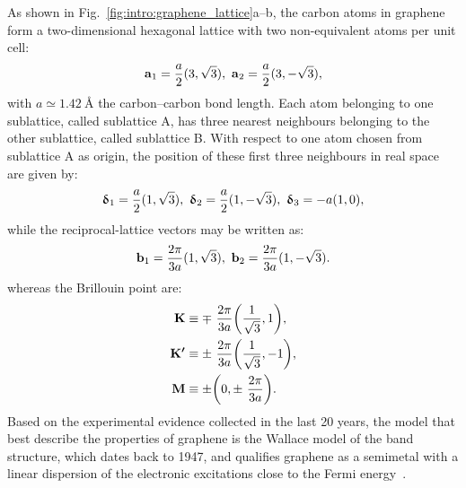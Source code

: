As shown in Fig.~\ref{fig:intro:graphene_lattice}a--b, the carbon atoms in graphene form a two-dimensional hexagonal lattice with two non-equivalent atoms per unit cell:
%
\begin{equation}\label{eq:graphene_lattice_vectors}
    \boldsymbol{\mathbf{a}}{_1} = \frac{a}{2}(3, \sqrt{3}),~
    \boldsymbol{\mathbf{a}}{_2} = \frac{a}{2}(3, -\sqrt{3}),
\end{equation}
%
with $a\simeq\SI{1.42}{\angstrom}$ the carbon--carbon bond length.
Each atom belonging to one sublattice, called sublattice A, has three nearest neighbours belonging to the other sublattice, called sublattice B. With respect to one atom chosen from sublattice A as origin, the position of these first three neighbours in real space are given by:
%
\begin{equation}\label{eq:graphene_first_neighbours}
    \boldsymbol{\mathbf{\updelta}}{_1} = \frac{a}{2}(1, \sqrt{3}),~
    \boldsymbol{\mathbf{\updelta}}{_2} = \frac{a}{2}(1, -\sqrt{3}),~
    \boldsymbol{\mathbf{\updelta}}{_3} = -a(1,0),
\end{equation}
%
while the reciprocal-lattice vectors may be written as:
%
\begin{equation}\label{eq:graphene_reciprocal_vectors}
    \boldsymbol{\mathbf{b}}{_1} = \frac{2\pi}{3a}(1, \sqrt{3}),~
    \boldsymbol{\mathbf{b}}{_2} = \frac{2\pi}{3a}(1, -\sqrt{3}).
\end{equation}
%
whereas the Brillouin point are:
%
\begin{align}\label{eq:K_point_components}
    \boldsymbol{\mathbf{K}}  & \equiv\mp~\frac{2\pi}{3a}\qty(\frac{1}{\sqrt{3}}, 1),  \\
    \boldsymbol{\mathbf{K'}} & \equiv\pm~\frac{2\pi}{3a}\qty(\frac{1}{\sqrt{3}}, -1), \\
    \boldsymbol{\mathbf{M}}  & \equiv\pm\qty(0, \pm~\frac{2\pi}{3a}).
\end{align}
%
Based on the experimental evidence collected in the last 20 years, the model that best describe the properties of graphene is the Wallace model of the band structure, which dates back to 1947, and qualifies graphene as a semimetal with a linear dispersion of the electronic excitations close to the Fermi energy~\cite{wallace1947band}.

